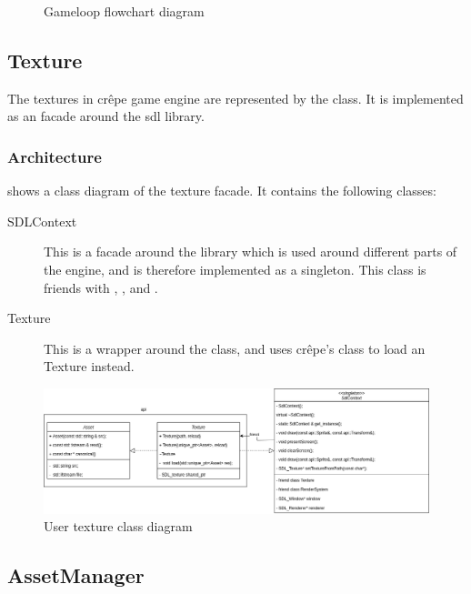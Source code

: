 \documentclass{projdoc}
\begin{document}
\begin{figure}
	\centering
	\caption{Gameloop flowchart diagram}
	\label{fig:gameloop-class}
\end{figure}
\subsection{Texture}

The textures in cr\^epe game engine are represented by the 
class. It is implemented as an \gls{facade} around the \gls{sdl} library.

\subsubsection{Architecture}

 shows a class diagram of the texture \gls{facade}. It
contains the following classes:\noparbreak
\begin{description}
	\item[SDLContext] This is a facade around the  library which is
		used around different parts of the engine, and is therefore implemented as a
		singleton. This class is friends with ,
		,  and
		.
	\item[Texture] This is a wrapper around the  class, and
		uses cr\^epe's  class to load an Texture instead.
\end{description}

\begin{figure}
	\centering
	\includegraphics[width=\textwidth]{img/texture.png}
	\caption{User texture class diagram}
	\label{fig:class-texture}
\end{figure}
\subsection{AssetManager}
\end{document}

